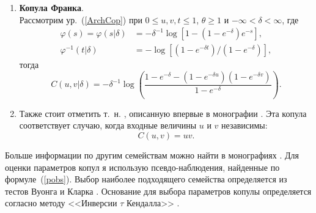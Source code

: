 \begin{enumerate}

\item \textbf{Копула Франка}.\\
Рассмотрим ур.~(\ref{ArchCop}) при $0 \le u,v,t \le 1$, $\theta \ge 1$ и $-\infty < \delta < \infty$, где
\begin{equation}
\begin{aligned}
    \varphi (s) = \varphi(s| \delta) &= -\delta^{-1}\log{[1-(1-e^{-\delta})e^{-s}]}, \\
    \varphi^{-1}(t| \delta) &= -\log{[(1-e^{-\delta t})/(1-e^{-\delta})]},
\end{aligned} \nonumber 
\end{equation}
тогда
\begin{equation}
    C(u,v|\delta) = -\delta^{-1} \log{\left(\frac{1 - e^{-\delta} - (1 - e^{-\delta u})(1 - e^{-\delta v})}{1 - e^{-\delta}}\right)}. \nonumber
    \end{equation}

\item Также стоит отметить т.~н. , описанную впервые в монографии \cite{Nelsen1999}. 
Эта копула соответствует случаю, когда входные величины $u$ и $v$ независимы:
\begin{equation}
    C(u,v) = uv. \nonumber
\end{equation} 
\end{enumerate}

Больше информации по другим семействам можно найти в монографиях \cite{Joe2014, Nelsen1999}.
Для оценки параметров копул я использую псевдо-наблюдения, найденные по формуле~(\ref{pobs}). 
Выбор наиболее подходящего семейства определяется из тестов Вуонга и Кларка \cite{Clarke2007, Vuong1989}. 
Основание для выбора параметров копулы определяется согласно методу <<Инверсии $\tau$ Кендалла>> \cite{Koj2010}. 


